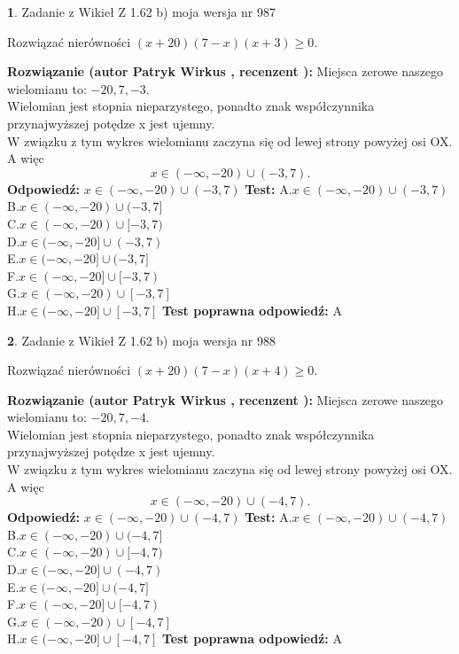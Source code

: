 \documentclass[12pt, a4paper]{article}
\theoremstyle{definition} %
\newtheorem{zad}{}
\newcommand{\zadStart}[1]{\begin{zad}#1\newline}
\newcommand{\zadStop}{\end{zad}}
\newcommand{\rozwStart}[2]{\noindent \textbf{Rozwiązanie (autor #1 , recenzent #2): }\newline}
\newcommand{\rozwStop}{\newline}
\newcommand{\odpStart}{\noindent \textbf{Odpowiedź:}\newline}
\newcommand{\odpStop}{\newline}
\newcommand{\testStart}{\noindent \textbf{Test:}\newline}
\newcommand{\testStop}{\newline}
\newcommand{\kluczStart}{\noindent \textbf{Test poprawna odpowiedź:}\newline}
\newcommand{\kluczStop}{\newline}
\begin{document}
\zadStart{Zadanie z Wikieł Z 1.62 b) moja wersja nr 987}

Rozwiązać nierówności $(x+20)(7-x)(x+3)\ge0$.
\zadStop
\rozwStart{Patryk Wirkus}{}
Miejsca zerowe naszego wielomianu to: $-20, 7, -3$.\\
Wielomian jest stopnia nieparzystego, ponadto znak współczynnika przy\linebreak najwyższej potędze x jest ujemny.\\ W związku z tym wykres wielomianu zaczyna się od lewej strony powyżej osi OX. A więc $$x \in (-\infty,-20) \cup (-3,7).$$
\rozwStop
\odpStart
$x \in (-\infty,-20) \cup (-3,7)$
\odpStop
\testStart
A.$x \in (-\infty,-20) \cup (-3,7)$\\
B.$x \in (-\infty,-20) \cup (-3,7]$\\
C.$x \in (-\infty,-20) \cup [-3,7)$\\
D.$x \in (-\infty,-20] \cup (-3,7)$\\
E.$x \in (-\infty,-20] \cup (-3,7]$\\
F.$x \in (-\infty,-20] \cup [-3,7)$\\
G.$x \in (-\infty,-20) \cup [-3,7]$\\
H.$x \in (-\infty,-20] \cup [-3,7]$
\testStop
\kluczStart
A
\kluczStop



\zadStart{Zadanie z Wikieł Z 1.62 b) moja wersja nr 988}

Rozwiązać nierówności $(x+20)(7-x)(x+4)\ge0$.
\zadStop
\rozwStart{Patryk Wirkus}{}
Miejsca zerowe naszego wielomianu to: $-20, 7, -4$.\\
Wielomian jest stopnia nieparzystego, ponadto znak współczynnika przy\linebreak najwyższej potędze x jest ujemny.\\ W związku z tym wykres wielomianu zaczyna się od lewej strony powyżej osi OX. A więc $$x \in (-\infty,-20) \cup (-4,7).$$
\rozwStop
\odpStart
$x \in (-\infty,-20) \cup (-4,7)$
\odpStop
\testStart
A.$x \in (-\infty,-20) \cup (-4,7)$\\
B.$x \in (-\infty,-20) \cup (-4,7]$\\
C.$x \in (-\infty,-20) \cup [-4,7)$\\
D.$x \in (-\infty,-20] \cup (-4,7)$\\
E.$x \in (-\infty,-20] \cup (-4,7]$\\
F.$x \in (-\infty,-20] \cup [-4,7)$\\
G.$x \in (-\infty,-20) \cup [-4,7]$\\
H.$x \in (-\infty,-20] \cup [-4,7]$
\testStop
\kluczStart
A
\kluczStop
\end{document}
